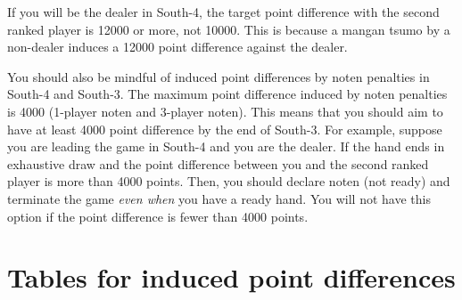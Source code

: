 \bigskip
If you will be the dealer in South-4, the target point difference with the second ranked player is 12000 or more, not 10000. This is because a {\jap mangan tsumo} by a non-dealer induces a 12000 point difference against the dealer. 

\bigskip
You should also be mindful of induced point differences by {\jap noten} penalties in South-4 and South-3. The maximum point difference induced by {\jap noten} penalties is 4000 (1-player {\jap noten} and 3-player {\jap noten}). This means that you should aim to have at least 4000 point difference by the end of South-3. 
For example, suppose you are leading the game in South-4 and you are the dealer. If the hand ends in exhaustive draw and the point difference between you and the second ranked player is more than 4000 points. Then, you should declare {\jap noten} (not ready) and terminate the game \emph{even when} you have a ready hand. You will not have this option if the point difference is fewer than 4000 points. 

\newpage

\section{Tables for induced point differences}

